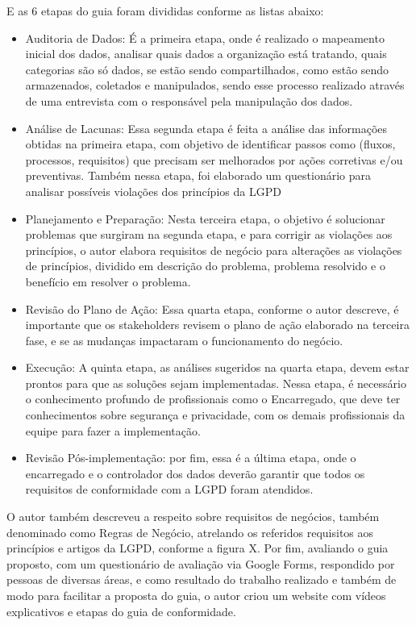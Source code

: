 \documentclass[
	12pt,				%
	openright,			%
	oneside,			%
	a4paper,			%
	english,			%
	french,				%
	spanish,			%
	brazil,				%
	]{abntex2}
\begin{document}
E as 6 etapas do guia foram divididas conforme as listas abaixo:
\begin{itemize}
\item Auditoria de Dados: É a primeira etapa, onde é realizado o mapeamento inicial dos dados, analisar quais dados a organização está tratando, quais categorias são só dados, se estão sendo compartilhados, como estão sendo armazenados, coletados e manipulados, sendo esse processo realizado através de uma entrevista com o responsável pela manipulação dos dados.
\item Análise de Lacunas: Essa segunda etapa é feita a análise das informações obtidas na primeira etapa, com objetivo de identificar passos como (fluxos, processos, requisitos) que precisam ser melhorados por ações corretivas e/ou preventivas. Também nessa etapa, foi elaborado um questionário para analisar possíveis violações dos princípios da LGPD
\item Planejamento e Preparação: Nesta terceira etapa, o objetivo é solucionar problemas que surgiram na segunda etapa, e para corrigir as violações aos princípios, o autor elabora requisitos de negócio para alterações as violações de princípios, dividido em descrição do problema, problema resolvido e o benefício em resolver o problema. 
\item Revisão do Plano de Ação: Essa quarta etapa, conforme o autor descreve, é importante que os stakeholders revisem o plano de ação elaborado na terceira fase, e se as mudanças impactaram o funcionamento do negócio.
\item Execução: A quinta etapa, as análises sugeridos na quarta etapa, devem estar prontos para que as soluções sejam implementadas. Nessa etapa, é necessário o conhecimento profundo de profissionais como o Encarregado, que deve ter conhecimentos sobre segurança e privacidade, com os demais profissionais da equipe para fazer a implementação.
\item Revisão Pós-implementação: por fim, essa é a última etapa, onde o encarregado e o controlador dos dados deverão garantir que todos os requisitos de conformidade com a LGPD foram atendidos.
\end{itemize}

O autor também descreveu a respeito sobre requisitos de negócios, também denominado como Regras de Negócio, atrelando os referidos requisitos aos princípios e artigos da LGPD, conforme a figura X. Por fim, avaliando o guia proposto, com um questionário de avaliação via Google Forms, respondido por pessoas de diversas áreas, e como resultado do trabalho realizado e também de modo para facilitar a proposta do guia, o autor criou um website com vídeos explicativos e etapas do guia de conformidade.
\end{document}
